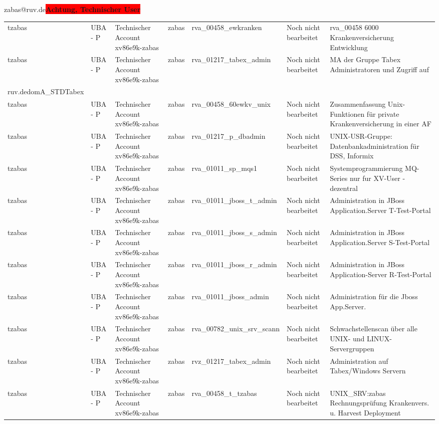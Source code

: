 \documentclass[a4paper,landscape,12pt]{letter}
\begin{document}
\begin{letter}{zabas@ruv.de\space\space\space\space\space\space\space\space\space\bfseries\colorbox{red}{Achtung, Technischer User}\hfill \break}
\begin{tiny}
\begin{longtable}{|p{35mm}|p{15mm}|p{25mm}|p{10mm}|p{40mm}|p{50mm}|p{50mm}|}
tzabas & UBA - P & Technischer Account xv86e9k-zabas & zabas & rva\_00458\_ewkranken & Noch nicht bearbeitet & rva\_00458 6000 Krankenversicherung Entwicklung \\
tzabas & UBA - P & Technischer Account xv86e9k-zabas & zabas & rva\_01217\_tabex\_admin & Noch nicht bearbeitet & MA der Gruppe Tabex Administratoren und Zugriff auf \\ruv.dedomA\_STDTabex \\
tzabas & UBA - P & Technischer Account xv86e9k-zabas & zabas & rva\_00458\_60ewkv\_unix & Noch nicht bearbeitet & Zusammenfassung Unix-Funktionen für private Krankenversicherung in einer AF \\
tzabas & UBA - P & Technischer Account xv86e9k-zabas & zabas & rva\_01217\_p\_dbadmin & Noch nicht bearbeitet & UNIX-USR-Gruppe: Datenbankadministration für  DSS, Informix \\
tzabas & UBA - P & Technischer Account xv86e9k-zabas & zabas & rva\_01011\_sp\_mqs1 & Noch nicht bearbeitet & Systemprogrammierung MQ-Series nur fur XV-User - dezentral \\
tzabas & UBA - P & Technischer Account xv86e9k-zabas & zabas & rva\_01011\_jboss\_t\_admin & Noch nicht bearbeitet & Administration in JBoss Application.Server T-Test-Portal \\
tzabas & UBA - P & Technischer Account xv86e9k-zabas & zabas & rva\_01011\_jboss\_s\_admin & Noch nicht bearbeitet & Administration in JBoss Application.Server S-Test-Portal \\
tzabas & UBA - P & Technischer Account xv86e9k-zabas & zabas & rva\_01011\_jboss\_r\_admin & Noch nicht bearbeitet & Administration in JBoss Application-Server R-Test-Portal \\
tzabas & UBA - P & Technischer Account xv86e9k-zabas & zabas & rva\_01011\_jboss\_admin & Noch nicht bearbeitet & Administration für die Jboss App.Server. \\
tzabas & UBA - P & Technischer Account xv86e9k-zabas & zabas & rva\_00782\_unix\_srv\_scann & Noch nicht bearbeitet & Schwachstellenscan über alle UNIX- und LINUX-Servergruppen \\
tzabas & UBA - P & Technischer Account xv86e9k-zabas & zabas & rvz\_01217\_tabex\_admin & Noch nicht bearbeitet & Administration auf Tabex/Windows Servern \\
tzabas & UBA - P & Technischer Account xv86e9k-zabas & zabas & rva\_00458\_t\_tzabas & Noch nicht bearbeitet & UNIX\_SRV:zabas Rechnungsprüfung Krankenvers. u. Harvest Deployment \\

\end{longtable}
\end{tiny}
\end{letter}
\end{document}
